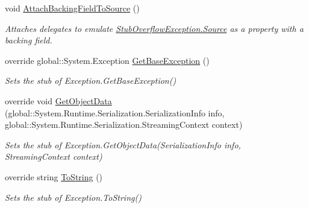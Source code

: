 \begin{DoxyCompactItemize}
void \hyperlink{class_system_1_1_fakes_1_1_stub_overflow_exception_a1f69efbd410f07b0f46859df86614e35}{Attach\-Backing\-Field\-To\-Source} ()
\begin{DoxyCompactList}\small\item\em Attaches delegates to emulate \hyperlink{class_system_1_1_fakes_1_1_stub_overflow_exception_adc9cf58e66319667b27af6d962e98f44}{Stub\-Overflow\-Exception.\-Source} as a property with a backing field.\end{DoxyCompactList}\item 
override global\-::\-System.\-Exception \hyperlink{class_system_1_1_fakes_1_1_stub_overflow_exception_abd77112480beed098743fe7d0d16e3a3}{Get\-Base\-Exception} ()
\begin{DoxyCompactList}\small\item\em Sets the stub of Exception.\-Get\-Base\-Exception()\end{DoxyCompactList}\item 
override void \hyperlink{class_system_1_1_fakes_1_1_stub_overflow_exception_a2d56fbb79734221e6442211a138863ef}{Get\-Object\-Data} (global\-::\-System.\-Runtime.\-Serialization.\-Serialization\-Info info, global\-::\-System.\-Runtime.\-Serialization.\-Streaming\-Context context)
\begin{DoxyCompactList}\small\item\em Sets the stub of Exception.\-Get\-Object\-Data(\-Serialization\-Info info, Streaming\-Context context)\end{DoxyCompactList}\item 
override string \hyperlink{class_system_1_1_fakes_1_1_stub_overflow_exception_ae226b7171ba5245489a6c330196447e3}{To\-String} ()
\begin{DoxyCompactList}\small\item\em Sets the stub of Exception.\-To\-String()\end{DoxyCompactList}\end{DoxyCompactItemize}
